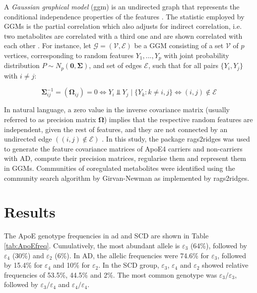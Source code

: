 \documentclass{amsart}
\begin{document}
A \textit{Gaussian graphical model} (\acrshort{ggm}) is an undirected graph that represents the conditional independence properties of the features \cite{KollerProbabilisticTechniques}. The statistic employed by GGMs is the partial correlation which also adjusts for indirect correlation, i.e. two metabolites are correlated with a third one and are shown correlated with each other \cite{Amara2022NetworksInterpretation}. For instance, let $\mathcal{G=(V,E)}$ be a GGM consisting of a set $\mathcal{V}$ of $p$ vertices, corresponding to random features $Y_1,...,Y_p$ with joint probability distribution $P \sim N_p(\mathbf{0, \Sigma})$, and set of edges $\mathcal{E}$, such that for all pairs $\{Y_i , Y_j\}$ with $i\neq j$:

\[ \mathbf{\Sigma}_{ij}^{-1} = (\mathbf{\Omega}_{ij})=0 \Longleftrightarrow Y_i \Perp Y_j\mid\{Y_k : k \neq i,j\} \Longleftrightarrow (i, j) \notin \mathcal{E} \]

In natural language, a zero value in the inverse covariance matrix (usually referred to as precision matrix $\mathbf{\Omega}$) implies that the respective random features are independent, given the rest of features, and they are not connected by an undirected edge $((i, j) \notin \mathcal{E})$ \cite{Peeters2022Rags2ridges:Matrices}. In this study, the package \textsf{rags2ridges} \cite{Peeters2022Rags2ridges:Matrices} was used to generate the feature covariance matrices of ApoE4 carriers and non-carriers with AD, compute their precision matrices, regularise them and represent them in GGMs. Communities of coregulated metabolites were identified using the community search algorithm by Girvan-Newman \cite{PhysRevE.69.026113} as implemented by \textsf{rags2ridges}.

\clearpage
\section{Results} \label{results}
The ApoE genotype frequencies in \acrshort{ad} and SCD are shown in Table \ref{tab:ApoEfreq}. Cumulatively, the most abundant allele is $\varepsilon_3$ (64\%), followed by $\varepsilon_4$ (30\%) and $\varepsilon_2$ (6\%). In AD, the allelic frequencies were 74.6\% for $\varepsilon_3$, followed by 15.4\% for $\varepsilon_4$ and 10\% for $\varepsilon_2$. In the SCD group, $\varepsilon_3$, $\varepsilon_4$ and $\varepsilon_2$ showed relative frequencies of 53.5\%, 44.5\% and 2\%. The most common genotype was $\varepsilon_3/\varepsilon_3$, followed by $\varepsilon_3/\varepsilon_4$ and $\varepsilon_4/\varepsilon_4$.
\end{document}
